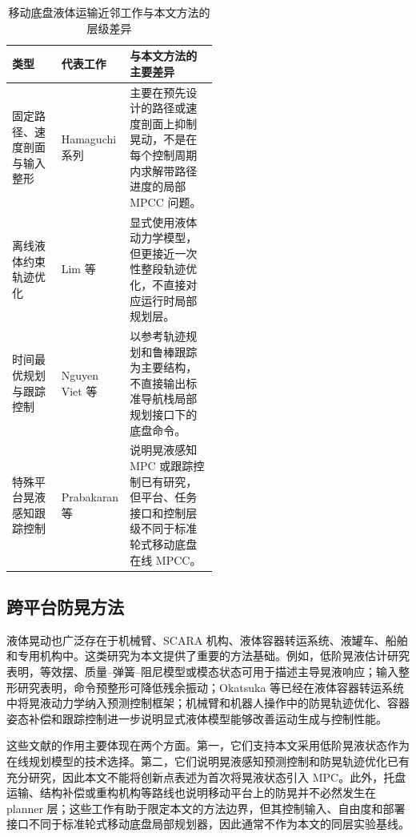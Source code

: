 \documentclass[12pt,a4paper]{ctexart}
\newcommand{\MPCC}{MPCC}
\newcommand{\MPC}{MPC}
\begin{document}
\begin{table}[htbp]
  \centering
  \small
  \caption{移动底盘液体运输近邻工作与本文方法的层级差异}
  \begin{tabularx}{\linewidth}{p{0.24\linewidth}p{0.27\linewidth}Y}
    \toprule
    类型 & 代表工作 & 与本文方法的主要差异 \\
    \midrule
    固定路径、速度剖面与输入整形 & Hamaguchi 系列\cite{B04_Hamaguchi2002,B03_Hamaguchi2004,B02_Hamaguchi2005} & 主要在预先设计的路径或速度剖面上抑制晃动，不是在每个控制周期内求解带路径进度的局部 \MPCC{} 问题。 \\
    离线液体约束轨迹优化 & Lim 等\cite{B01_Lim2024} & 显式使用液体动力学模型，但更接近一次性整段轨迹优化，不直接对应运行时局部规划层。 \\
    时间最优规划与跟踪控制 & Nguyen Viet 等\cite{B11_Viet2025} & 以参考轨迹规划和鲁棒跟踪为主要结构，不直接输出标准导航栈局部规划接口下的底盘命令。 \\
    特殊平台晃液感知跟踪控制 & Prabakaran 等\cite{B12_Prabakaran2026} & 说明晃液感知 \MPC{} 或跟踪控制已有研究，但平台、任务接口和控制层级不同于标准轮式移动底盘在线 \MPCC{}。 \\
    \bottomrule
  \end{tabularx}
\end{table}

\subsection{跨平台防晃方法}
\label{subsec:cross-platform-slosh-control}

液体晃动也广泛存在于机械臂、SCARA 机构、液体容器转运系统、液罐车、船舶和专用机构中。这类研究为本文提供了重要的方法基础。例如，低阶晃液估计研究表明，等效摆、质量--弹簧--阻尼模型或模态状态可用于描述主导晃液响应\cite{A02_Guagliumi2021,A01_Leva2021}；输入整形研究表明，命令预整形可降低残余振动\cite{A07_Singer1990}；Okatsuka 等已经在液体容器转运系统中将晃液动力学纳入预测控制框架\cite{A12_Okatsuka2011,C05_Okatsuka2012}；机械臂和机器人操作中的防晃轨迹优化、容器姿态补偿和跟踪控制进一步说明显式液体模型能够改善运动生成与控制性能\cite{C02_Muchacho2022,C03_Moriello2018,C06_Viet2024}。

这些文献的作用主要体现在两个方面。第一，它们支持本文采用低阶晃液状态作为在线规划模型的技术选择。第二，它们说明晃液感知预测控制和防晃轨迹优化已有充分研究，因此本文不能将创新点表述为首次将晃液状态引入 \MPC{}。此外，托盘运输、结构补偿或重构机构等路线也说明移动平台上的防晃并不必然发生在 planner 层；这些工作有助于限定本文的方法边界，但其控制输入、自由度和部署接口不同于标准轮式移动底盘局部规划器，因此通常不作为本文的同层实验基线。
\end{document}
